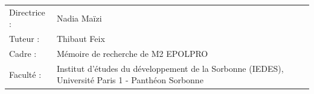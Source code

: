 \begin{titlepage}
\begin{center}
\begin{center}
\end{center}


\bigskip

\bigskip

\begin{tabular}{lp{10cm}}
    Directrice : & Nadia Maïzi \\
    Tuteur : &  Thibaut Feix\\
    Cadre : & Mémoire de recherche de M2 EPOLPRO \\
    Faculté : & Institut d'études du développement de la Sorbonne (IEDES), Université Paris 1 - Panthéon Sorbonne
\end{tabular}

\bigskip
\bigskip

\begin{tabular}{p{15mm}p{10cm}}
\end{tabular}

\end{center}




\end{titlepage}
